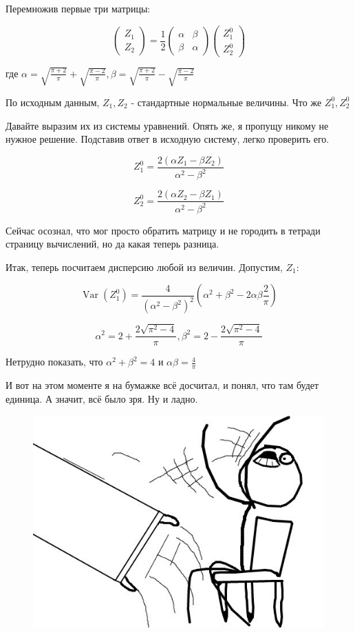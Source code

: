 \documentclass[a4paper,12pt]{article}
\DeclareMathOperator{\Var}{Var}
\begin{document}
Перемножив первые три матрицы:

\[ \begin{pmatrix}
Z_1\\
Z_2
\end{pmatrix} = \frac{1}{2} \begin{pmatrix}
\alpha & \beta\\
\beta & \alpha
\end{pmatrix} 
\begin{pmatrix}
Z_1^0\\
Z_2^0
\end{pmatrix}\]

где $  \alpha =  \sqrt{\frac{\pi + 2}{\pi}} + \sqrt{\frac{\pi - 2}{\pi}}, \beta =  \sqrt{\frac{\pi + 2}{\pi}} - \sqrt{\frac{\pi - 2}{\pi}}  $

По исходным данным, $ Z_1, Z_2 $ - стандартные нормальные величины. Что же $ Z_1^0, Z_2^0 $ 

Давайте выразим их из системы уравнений. Опять же, я пропущу никому не нужное решение. Подставив ответ в исходную систему, легко проверить его.

\[ Z_1^0 = \frac{2(\alpha Z_1 - \beta Z_2)}{\alpha^2 - \beta^2} \]

\[ Z_2^0 = \frac{2(\alpha Z_2 - \beta Z_1)}{\alpha^2 - \beta^2} \]

Сейчас осознал, что мог просто обратить матрицу и не городить в тетради страницу вычислений, но да какая теперь разница.

Итак, теперь посчитаем дисперсию любой из величин. Допустим, $ Z_1 $:

\[ \Var(Z_1^0) = \frac{4}{(\alpha^2 - \beta^2)^2} (\alpha^2 + \beta^2 - 2\alpha \beta \frac{2}{\pi})\]

\[ \alpha^2 = 2 + \frac{2\sqrt{\pi^2 - 4}}{\pi},  \beta^2 = 2 - \frac{2\sqrt{\pi^2 - 4}}{\pi}  \]

Нетрудно показать, что $ \alpha^2 + \beta^2 = 4 $ и $ \alpha \beta = \frac{4}{\pi} $

И вот на этом моменте я на бумажке всё досчитал, и понял, что там будет единица. А значит, всё было зря. Ну и ладно.

\begin{figure}[h]
	\includegraphics{71}
\end{figure}
\end{document}
